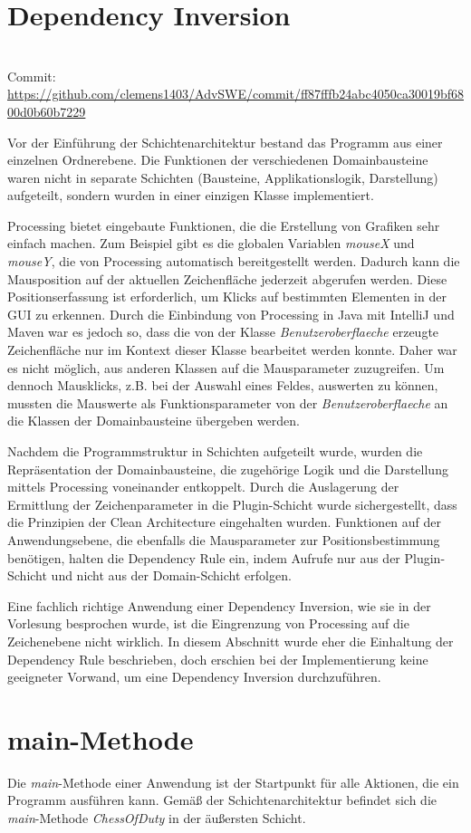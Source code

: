 \section{Dependency Inversion}

\begin{balken}
    \tip
    \\
    Commit: \\
    \footnotesize \url{https://github.com/clemens1403/AdvSWE/commit/ff87fffb24abc4050ca30019bf6800d0b60b7229}

\end{balken}

Vor der Einführung der Schichtenarchitektur bestand das Programm aus einer einzelnen Ordnerebene. 
Die Funktionen der verschiedenen Domainbausteine waren nicht in separate Schichten (Bausteine, Applikationslogik, Darstellung) aufgeteilt, sondern wurden in einer einzigen Klasse implementiert.

Processing bietet eingebaute Funktionen, die die Erstellung von Grafiken sehr einfach machen. 
Zum Beispiel gibt es die globalen Variablen \textit{mouseX} und \textit{mouseY}, die von Processing automatisch bereitgestellt werden. 
Dadurch kann die Mausposition auf der aktuellen Zeichenfläche jederzeit abgerufen werden. 
Diese Positionserfassung ist erforderlich, um Klicks auf bestimmten Elementen in der GUI zu erkennen. 
Durch die Einbindung von Processing in Java mit IntelliJ und Maven war es jedoch so, dass die von der Klasse \textit{Benutzeroberflaeche} erzeugte Zeichenfläche nur im Kontext dieser Klasse bearbeitet werden konnte. 
Daher war es nicht möglich, aus anderen Klassen auf die Mausparameter zuzugreifen. 
Um dennoch Mausklicks, z.B. bei der Auswahl eines Feldes, auswerten zu können, mussten die Mauswerte als Funktionsparameter von der \textit{Benutzeroberflaeche} an die Klassen der Domainbausteine übergeben werden.

Nachdem die Programmstruktur in Schichten aufgeteilt wurde, wurden die Repräsentation der Domainbausteine, die zugehörige Logik und die Darstellung mittels Processing voneinander entkoppelt. 
Durch die Auslagerung der Ermittlung der Zeichenparameter in die Plugin-Schicht wurde sichergestellt, dass die Prinzipien der Clean Architecture eingehalten wurden. 
Funktionen auf der Anwendungsebene, die ebenfalls die Mausparameter zur Positionsbestimmung benötigen, halten die Dependency Rule ein, indem Aufrufe nur aus der Plugin-Schicht und nicht aus der Domain-Schicht erfolgen.

Eine fachlich richtige Anwendung einer Dependency Inversion, wie sie in der Vorlesung besprochen wurde, ist die Eingrenzung von Processing auf die Zeichenebene nicht wirklich. 
In diesem Abschnitt wurde eher die Einhaltung der Dependency Rule beschrieben, doch erschien bei der Implementierung keine geeigneter Vorwand, um eine Dependency Inversion durchzuführen. 

\section{main-Methode}

Die \textit{main}-Methode einer Anwendung ist der Startpunkt für alle Aktionen, die ein Programm ausführen kann. 
Gemäß der Schichtenarchitektur befindet sich die \textit{main}-Methode \textit{ChessOfDuty} in der äußersten Schicht.